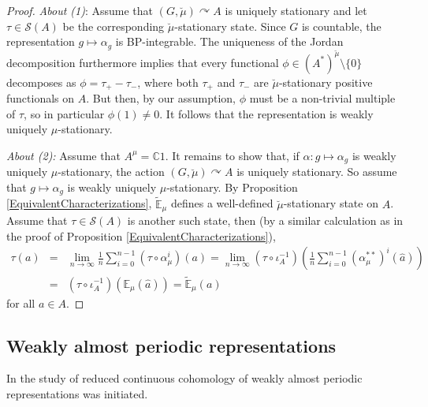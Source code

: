 \documentclass[a4paper,11pt,reqno]{amsart}
\numberwithin{equation}{section}
\theoremstyle{definition}
\theoremstyle{remark}
\theoremstyle{remark}
\begin{document}
\begin{proof} \emph{About (1)}: Assume that $(G,\breve{\mu})\curvearrowright A$ is uniquely stationary and let $\tau\in\mathcal{S}(A)$ be the corresponding $\breve{\mu}$-stationary state. Since $G$ is countable, the representation $g\mapsto\alpha_{g}$ is BP-integrable. The uniqueness of the Jordan decomposition furthermore implies that every functional $\phi\in(A^{\ast})^{\breve{\mu}}\setminus\{0\}$ decomposes as $\phi=\tau_{+}-\tau_{-}$, where both $\tau_{+}$ and $\tau_{-}$ are $\breve{\mu}$-stationary positive functionals on $A$. But then, by our assumption, $\phi$ must be a non-trivial multiple of $\tau$, so in particular $\phi(1)\neq0$. It follows that the representation is weakly uniquely $\mu$-stationary.

\emph{About (2):} Assume that $A^{\mu}=\mathbb{C}1$. It remains to show that, if $\alpha : g\mapsto\alpha_{g}$ is weakly uniquely $\mu$-stationary, the action $(G,\breve{\mu})\curvearrowright A$ is uniquely stationary. So assume that $g\mapsto\alpha_{g}$ is weakly uniquely $\mu$-stationary. By Proposition \ref{EquivalentCharacterizations}, $\widetilde{\mathbb{E}}_{\mu}$ defines a well-defined $\breve{\mu}$-stationary state on $A$. Assume that $\tau\in\mathcal{S}(A)$ is another such state, then (by a similar calculation as in the proof of Proposition \ref{EquivalentCharacterizations}), 
\begin{eqnarray*}
\tau(a) & = & \lim_{n\rightarrow\infty}\frac{1}{n}\sum_{i=0}^{n-1}\left(\tau\circ\alpha_{\mu}^{i}\right)(a)=\lim_{n\rightarrow\infty}\left(\tau\circ\iota_{A}^{-1}\right)\left(\frac{1}{n}\sum_{i=0}^{n-1}(\alpha_{\mu}^{\ast\ast})^{i}(\widehat{a})\right)\\
 & = & \left(\tau\circ\iota_{A}^{-1}\right)\left(\mathbb{E}_{\mu}(\widehat{a})\right)=\widetilde{\mathbb{E}}_{\mu}(a)
\end{eqnarray*}
for all $a\in A$. \end{proof}

\vspace{3mm}


\subsection{Weakly almost periodic representations\label{subsec:Weakly-almost-periodic}}

In \cite{BaderRosendalSauer} the study of reduced continuous cohomology of weakly almost periodic representations was initiated.
\end{document}

